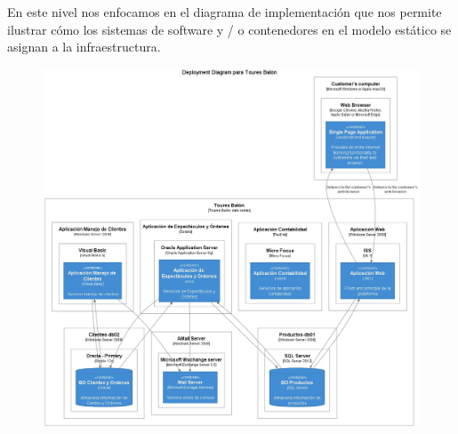 \documentclass[12pt]{article}
\begin{document}
En este nivel nos enfocamos en el diagrama de implementación que nos permite ilustrar cómo los sistemas de software y / o contenedores en el modelo estático se asignan a la infraestructura.


\begin{figure}[ht]
\centering
\centering
\includegraphics[scale=0.4]{C4.jpeg}
\label{2}
\end{figure}
\FloatBarrier




\end{document}
